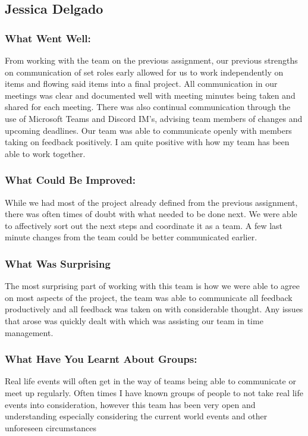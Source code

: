 \documentclass[11pt, oneside, a4paper, titlepage]{article}
\begin{document}
\subsection{Jessica Delgado}
\subsubsection{What Went Well:}
From working with the team on the previous assignment, our previous strengths on communication of set roles early allowed for us to work independently on items and flowing said items into a final project. All communication in our meetings was clear and documented well with meeting minutes being taken and shared for each meeting. There was also continual communication through the use of Microsoft Teams and Discord IM’s, advising team members of changes and upcoming deadlines. Our team was able to communicate openly with members taking on feedback positively. I am quite positive with how my team has been able to work together.

\subsubsection{What Could Be Improved:}
While we had most of the project already defined from the previous assignment, there was often times of doubt with what needed to be done next. We were able to affectively sort out the next steps and coordinate it as a team. A few last minute changes from the team could be better communicated earlier. 

\subsubsection{What Was Surprising}
The most surprising part of working with this team is how we were able to agree on most aspects of the project, the team was able to communicate all feedback productively and all feedback was taken on with considerable thought. Any issues that arose was quickly dealt with which was assisting our team in time management. 

\subsubsection{What Have You Learnt About Groups:}
Real life events will often get in the way of teams being able to communicate or meet up regularly. Often times I have known groups of people to not take real life events into consideration, however this team has been very open and understanding especially considering the current world events and other unforeseen circumstances 
\end{document}

